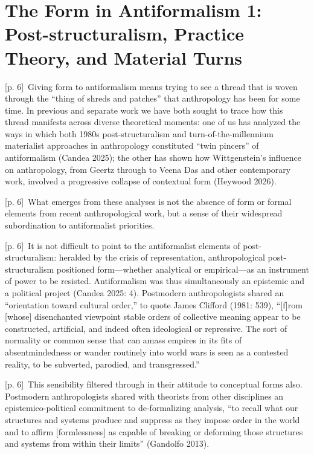 \documentclass[10pt,a4paper]{article}
\begin{document}
\section*{The Form in Antiformalism 1: Post-structuralism, Practice Theory, and Material Turns}
{\scriptsize\color{gray} [p. 6]}\ Giving form to antiformalism means trying to see a thread that is woven through the “thing of shreds and patches” that anthropology has been for some time. In previous and separate work we have both sought to trace how this thread manifests across diverse theoretical moments: one of us has analyzed the ways in which both 1980s post-structuralism and turn-of-the-millennium materialist approaches in anthropology constituted “twin pincers” of antiformalism (Candea 2025); the other has shown how Wittgenstein’s influence on anthropology, from Geertz through to Veena Das and other contemporary work, involved a progressive collapse of contextual form (Heywood 2026).\par
{\scriptsize\color{gray} [p. 6]}\ What emerges from these analyses is not the absence of form or formal elements from recent anthropological work, but a sense of their widespread subordination to antiformalist priorities.\par
{\scriptsize\color{gray} [p. 6]}\ It is not difficult to point to the antiformalist elements of post-structuralism: heralded by the crisis of representation, anthropological post-structuralism positioned form—whether analytical or empirical—as an instrument of power to be resisted. Antiformalism was thus simultaneously an epistemic and a political project (Candea 2025: 4). Postmodern anthropologists shared an “orientation toward cultural order,” to quote James Clifford (1981: 539), “[f]rom [whose] disenchanted viewpoint stable orders of collective meaning appear to be constructed, artificial, and indeed often ideological or repressive. The sort of normality or common sense that can amass empires in its fits of absentmindedness or wander routinely into world wars is seen as a contested reality, to be subverted, parodied, and transgressed.”\par
{\scriptsize\color{gray} [p. 6]}\ This sensibility filtered through in their attitude to conceptual forms also. Postmodern anthropologists shared with theorists from other disciplines an epistemico-political commitment to de-formalizing analysis, “to recall what our structures and systems produce and suppress as they impose order in the world and to affirm [formlessness] as capable of breaking or deforming those structures and systems from within their limits” (Gandolfo 2013).\par
\end{document}
